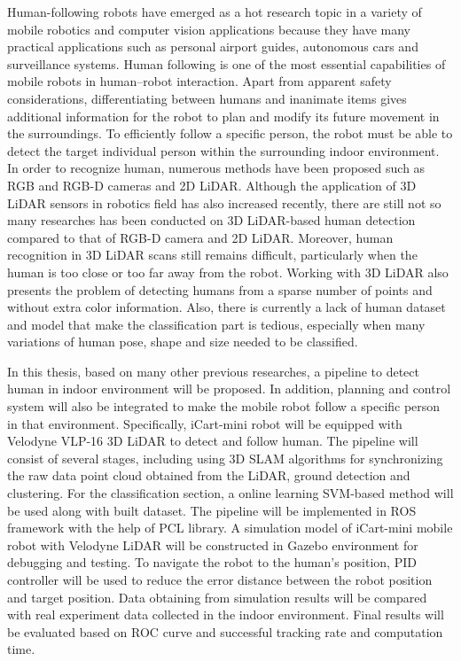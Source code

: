 
Human-following robots have emerged as a hot research topic in a variety of mobile robotics and computer vision applications because they have many practical applications such as personal airport guides, autonomous cars and surveillance systems. Human following is one of the most essential capabilities of mobile robots in human–robot interaction. Apart from apparent safety considerations, differentiating between humans and inanimate items gives additional information for the robot to plan and modify its future movement in the surroundings. To efficiently follow a specific person, the robot must be able to detect the target individual person within the surrounding indoor environment. In order to recognize human, numerous methods have been proposed such as RGB and RGB-D cameras and 2D LiDAR. Although the application of 3D LiDAR sensors in robotics field has also increased recently, there are still not so many researches has been conducted on 3D LiDAR-based human detection compared to that of RGB-D camera and 2D LiDAR. Moreover, human recognition in 3D LiDAR scans still remains difficult, particularly when the human is too close or too far away from the robot. Working with 3D LiDAR also presents the problem of detecting humans from a sparse number of points and without extra color information. Also, there is currently a lack of human dataset and model that make the classification part is tedious, especially when many variations of human pose, shape and size needed to be classified. 

In this thesis, based on many other previous researches, a pipeline to detect human in indoor environment will be proposed. In addition, planning and control system will also be integrated to make the mobile robot follow a specific person in that environment. Specifically, iCart-mini robot will be equipped with Velodyne VLP-16 3D LiDAR to detect and follow human. The pipeline will consist of several stages, including using 3D SLAM algorithms for synchronizing the raw data point cloud obtained from the LiDAR, ground detection and clustering. For the classification section, a online learning SVM-based method will be used along with built dataset. The pipeline will be implemented in ROS framework with the help of PCL library. A simulation model of iCart-mini mobile robot with Velodyne LiDAR will be constructed in Gazebo environment for debugging and testing. To navigate the robot to the human’s position, PID controller will be used to reduce the error distance between the robot position and target position. Data obtaining from simulation results will be compared with real experiment data collected in the indoor environment. Final results will be evaluated based on ROC curve and successful tracking rate and computation time. 